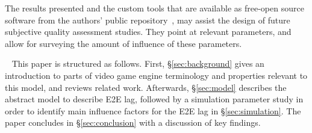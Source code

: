The results presented and the custom tools that are available as free-open source software from the authors' public repository~\cite{onlinegame-lag-sim-repo}, may assist the design of future subjective quality assessment studies. They point at relevant parameters, and allow for surveying the amount of influence of these parameters.


~\newline
This paper is structured as follows. First, §\ref{sec:background} gives an introduction to parts of video game engine terminology and properties relevant to this model, %
and reviews related work.
Afterwards, §\ref{sec:model} describes the abstract model to describe \gls{E2E} lag, followed by a simulation parameter study in order to identify main influence factors for the \gls{E2E} lag in §\ref{sec:simulation}. The paper concludes in §\ref{sec:conclusion} with a discussion of key findings.




